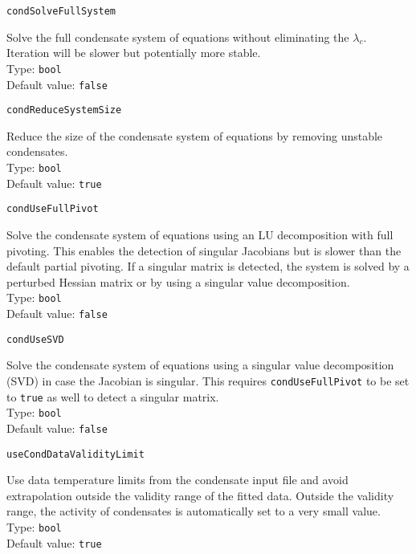 \documentclass[numbers=noenddot]{aux/fcmanual}
\begin{document}
\lstinline!condSolveFullSystem!
\begin{addmargin}[25pt]{0pt}
	Solve the full condensate system of equations without eliminating the $\lambda_c$. Iteration will be slower but potentially more stable.\\
	Type: \lstinline!bool!\\
	Default value: \lstinline!false!
\end{addmargin}

\lstinline!condReduceSystemSize!
\begin{addmargin}[25pt]{0pt}
	Reduce the size of the condensate system of equations by removing unstable condensates.\\
	Type: \lstinline!bool!\\
	Default value: \lstinline!true!
\end{addmargin}

\lstinline!condUseFullPivot!
\begin{addmargin}[25pt]{0pt}
	Solve the condensate system of equations using an LU decomposition with full pivoting. This enables the detection of singular Jacobians but is slower than the default partial pivoting. If a singular matrix is detected, the system is solved by a perturbed Hessian matrix or by using a singular value decomposition.\\
	Type: \lstinline!bool!\\
	Default value: \lstinline!false!
\end{addmargin}

\lstinline!condUseSVD!
\begin{addmargin}[25pt]{0pt}
	Solve the condensate system of equations using a singular value decomposition (SVD) in case the Jacobian is singular. This requires \lstinline!condUseFullPivot! to be set to \lstinline!true! as well to detect a singular matrix.\\
	Type: \lstinline!bool!\\
	Default value: \lstinline!false!
\end{addmargin}

\lstinline!useCondDataValidityLimit!
\begin{addmargin}[25pt]{0pt}
	Use data temperature limits from the condensate input file and avoid extrapolation outside the validity range of the fitted data. Outside the validity range, the activity of condensates is automatically set to a very small value.\\
	Type: \lstinline!bool!\\
	Default value: \lstinline!true!
\end{addmargin}
\end{document}

